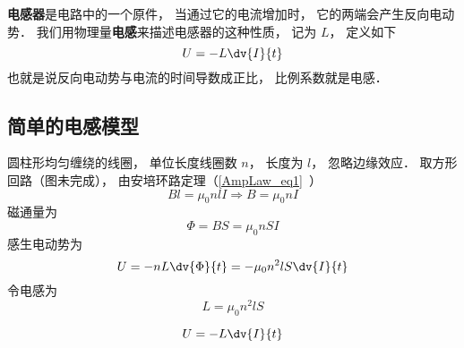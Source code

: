 

\textbf{电感器}是电路中的一个原件， 当通过它的电流增加时， 它的两端会产生反向电动势． 我们用物理量\textbf{电感}来描述电感器的这种性质， 记为 $L$， 定义如下
\begin{equation}
U = -L\dv{I}{t}
\end{equation}
也就是说反向电动势与电流的时间导数成正比， 比例系数就是电感．

\subsection{简单的电感模型}
圆柱形均匀缠绕的线圈， 单位长度线圈数 $n$， 长度为 $l$， 忽略边缘效应． 取方形回路（图未完成）， 由安培环路定理（\autoref{AmpLaw_eq1}~）
\begin{equation}
Bl = \mu_0nlI \Rightarrow B = \mu_0nI
\end{equation}
磁通量为
\begin{equation}
\Phi = BS = \mu_0nSI
\end{equation}
感生电动势为
\begin{equation}
U = -nL\dv{\Phi}{t} = -\mu_0n^2lS \dv{I}{t}
\end{equation}
令电感为
\begin{equation}
L = \mu_0n^2lS
\end{equation}

\begin{equation}
U = -L\dv{I}{t}
\end{equation}
